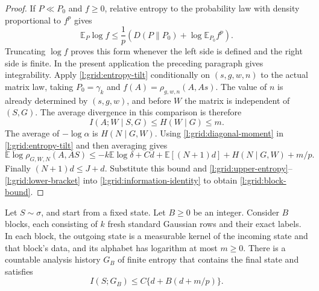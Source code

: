 \begin{proof}
If $P\ll P_0$ and $f\ge0$, relative entropy to the probability law
with density proportional to $f^p$ gives
\begin{equation}\label{l:grid:entropy-tilt}
 \mathbb E_P\log f\le
 \frac1p\left(D(P\|P_0)+\log\mathbb E_{P_0}f^p\right).
\end{equation}
Truncating $\log f$ proves this form whenever the left side is defined
and the right side is finite.  In the present application the preceding
paragraph gives integrability.
Apply \eqref{l:grid:entropy-tilt} conditionally on $(s,g,w,n)$ to the
actual matrix law, taking $P_0=\gamma_k$ and
$f(A)=\rho_{g,w,n}(A,As)$.  The value of $n$ is already determined by
$(s,g,w)$, and before $W$ the matrix is independent of $(S,G)$.
The average divergence in this comparison is therefore
\[
 I(A;W\mid S,G)\le H(W\mid G)\le m.
\]
The average of $-\log\alpha$ is $H(N\mid G,W)$.  Using
\eqref{l:grid:diagonal-moment} in \eqref{l:grid:entropy-tilt} and then
averaging gives
\[
 \mathbb E\log\rho_{G,W,N}(A,AS)
 \le-k\mathbb E\log\delta+Cd+\mathbb E[(N+1)d]
       +H(N\mid G,W)+m/p.
\]
Finally $(N+1)d\le J+d$.  Substitute this bound and
\eqref{l:grid:upper-entropy}--\eqref{l:grid:lower-bracket} into
\eqref{l:grid:information-identity} to obtain
\eqref{l:grid:block-bound}.
\end{proof}

\begin{proposition}
\label{l:grid:iteration}
Let $S\sim\sigma$, and start from a fixed state.  Let $B\ge0$ be an integer.
Consider $B$ blocks, each consisting of $k$ fresh standard Gaussian rows and their
exact labels.  In each block, the outgoing state is a measurable kernel
of the incoming state and that block's data, and its alphabet has
logarithm at most $m\ge0$.  There is a countable analysis history $G_B$ of
finite entropy that contains the final state and satisfies
\begin{equation}\label{l:grid:final-information}
 I(S;G_B)\le C\{d+B(d+m/p)\}.
\end{equation}
\end{proposition}

